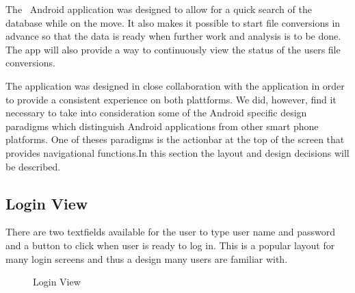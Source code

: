 


The \appName\ Android application was designed to allow for a quick search of the database while on the move. It also makes it possible to start file conversions in advance so that the data is ready when further work and analysis is to be done. The app will also provide a way to continuously view the status of the users file conversions. 

The application was designed in close collaboration with the  application in order to provide a consistent experience on both plattforms.  We did, however, find it necessary to take into consideration some of the Android specific design paradigms which distinguish Android applications from other smart phone platforms. One of theses paradigms is the actionbar at the top of the screen that provides navigational functions.In this section the layout and design decisions will be described.


\subsection{Login View}
There are two textfields available for the user to type user name and password and a button to click when user is ready to log in. This is a popular layout for many login screens and thus a design many users are familiar with.


\begin{figure}[ht]
\caption{\label{fig:and_login}Login View}
\end{figure}
\FloatBarrier

